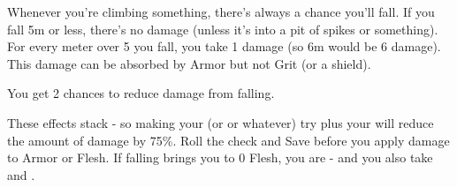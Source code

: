 \cbreak


  Whenever you're climbing something, there's always a chance you'll fall. If you fall 5m or less, there's no damage (unless it's into a pit of spikes or something). For every meter over 5 you fall, you take 1 damage (so 6m would be 6 damage).  This damage can be absorbed by Armor but not Grit (or a shield).  

  You get 2 chances to reduce damage from falling.


  These effects stack - so making your \VIG (or \DEX or whatever) try plus your  will reduce the amount of damage by 75\%.  Roll the check and Save before you apply damage to Armor or Flesh.  If falling brings you to 0 Flesh, you are  - and you also take  and .

